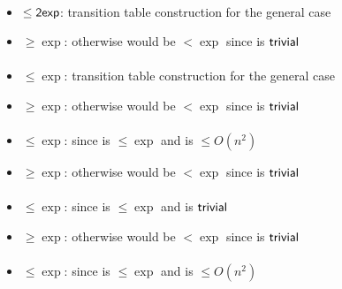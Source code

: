\paragraph{\OLA{}\tto\ODFA}
\begin{itemize}
	\item $\le\mathsf{2exp}$: transition table construction for the general case \cite{PigPis14}
	\item $\ge\exp$: otherwise \hyperref[cost:1DLAto1DFAu]{\ODLA{}\tto\ODFA} would be $<\exp$ since \ODLA{}\tto\OLA is $\mathsf{trivial}$
\end{itemize}
\paragraph{\OLA{}\tto\ONFA}\label{cost:1DLAto1NFAu}
\begin{itemize}
	\item $\le\exp$: transition table construction for the general case \cite{PigPis14}
	\item $\ge\exp$: otherwise \hyperref[cost:1DLAto1NFAu]{\OLA{}\tto\ONFA} would be $<\exp$ since \ODLA{}\tto\OLA is $\mathsf{trivial}$
\end{itemize}
\paragraph{\OLA{}\tto\TDFA}
\begin{itemize}
	\item $\le\exp$: since \hyperref[cost:1LAto1NFAu]{\ODLA{}\tto\ONFA} is $\le\exp$ and \hyperref[cost:1NFAto2DFAu]{\ONFA{}\tto\TDFA} is $\le O(n^2)$
	\item $\ge\exp$: otherwise \hyperref[cost:1DLAto2DFAu]{\ODLA{}\tto\TDFA} would be $<\exp$ since \ODLA{}\tto\OLA is $\mathsf{trivial}$
\end{itemize}
\paragraph{\OLA{}\tto\TNFA}
\begin{itemize}
	\item $\le\exp$: since \hyperref[cost:1LAto1NFAu]{\ODLA{}\tto\ONFA} is $\le\exp$ and \ONFA{}\tto\TNFA is $\mathsf{trivial}$
	\item $\ge\exp$: otherwise \hyperref[cost:1DLAto2DFAu]{\ODLA{}\tto\TDFA} would be $<\exp$ since \ODLA{}\tto\OLA is $\mathsf{trivial}$
\end{itemize}
\paragraph{\OLA{}\tto\ODLA}
\begin{itemize}
	\item $\le\exp$: since \hyperref[cost:1LAto1NFAu]{\ODLA{}\tto\ONFA} is $\le\exp$ and \hyperref[cost:1NFAto1DLAu]{\ONFA{}\tto\ODLA} is $\le O(n^2)$
\end{itemize}

